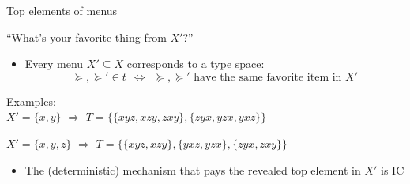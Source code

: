 \begin{frame}{Top elements of menus}{}

``What's your favorite thing from $X'$?''

\begin{itemize}
\item Every menu $X'\subseteq X$ corresponds to a type space:
$$\succeq,\succeq'\in t ~~ \Longleftrightarrow ~~ \succeq,\succeq'\text{ have the same favorite item in }X'$$
\end{itemize}


\smallskip

\underline{Examples}:\\

$X'=\{x,y\}$ $\Longrightarrow$ $T=\{ \{xyz, xzy, zxy\}, \{zyx, yzx, yxz\} \}$

\medskip

$X'=\{x,y,z\}$ $\Longrightarrow$  $T=\{ \{xyz, xzy\}, \{yxz, yzx\}, \{zyx, zxy\} \}$

\pause

\bigskip

\begin{itemize}
\item The (deterministic) mechanism that pays the revealed top element in $X'$ is IC

%
\end{itemize}

\end{frame}


%
%
%
%
%
%
%


